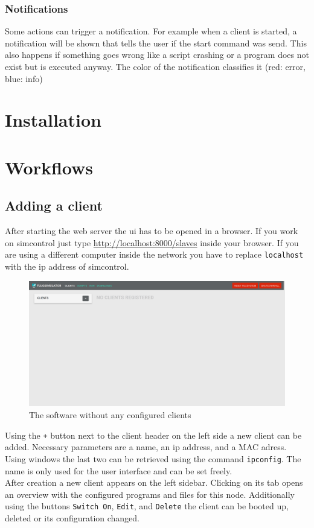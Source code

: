 \documentclass[accentcolor=tud1a, paper=a4, colorback]{tudreport}
\newcommand{\ind}[1]{#1\index{#1}}
\begin{document}
	\subsection{Notifications}
	Some actions can trigger a notification. For example when a client is started, a notification will be shown that
	tells the user if the start command was send. This also happens if something goes wrong like a script crashing
	or a program does not exist but is executed anyway. The color of the notification classifies it
	({\color{red}red: error}, {\color{blue}blue: info})

	\chapter{Installation}
	

	\chapter{Workflows}
	\section{Adding a client}
	After starting the web server the ui has to be opened in a browser.
	If you work on \ind{simcontrol} just type \url{http://localhost:8000/slaves} inside
	your browser. If you are using a different computer inside the network you
	have to replace \texttt{localhost} with the ip address of simcontrol.
	\\
	\begin{figure}[h]
		\centering
		\label{empty_startpage}
		\includegraphics[width=.9\textwidth]{empty_startpage}
		\caption{The software without any configured clients}
	\end{figure}
	Using the \texttt{+} button next to the client header on the left side
	a new client can be added. Necessary parameters are a name, an ip address,
	and a MAC adress. Using windows the last two can be retrieved using
	the command \texttt{ipconfig}. The name is only used for the user interface
	and can be set freely.
	\\
	After creation a new client appears on the left sidebar. Clicking on its tab
	opens an overview with the configured programs and files for this node.
	Additionally using the buttons \texttt{Switch On}, \texttt{Edit}, and \texttt{Delete}
	the client can be booted up, deleted or its configuration changed.
\end{document}
